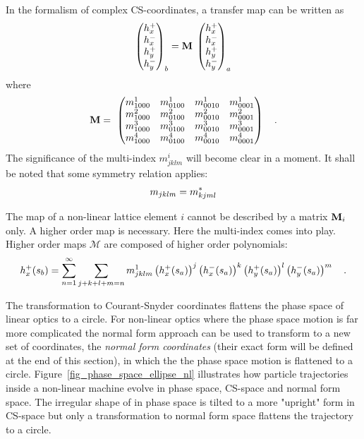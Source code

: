In the formalism of complex CS-coordinates, a transfer map can be written as
%
\begin{equation}
    \begin{pmatrix}
        h_x^+ \\ h_x^- \\ h_y^+ \\ h_y^-
    \end{pmatrix}_b
    =
    \mathbf{M}\;
    \begin{pmatrix}
        h_x^+ \\ h_x^- \\ h_y^+ \\ h_y^-
    \end{pmatrix}_a
\end{equation}
%
where
%
\begin{equation}
 \mathbf{M}  = \
 \begin{pmatrix}
   m_{1000}^1 & m_{0100}^1 & m_{0010}^1 & m_{0001}^1 \\
   m_{1000}^2 & m_{0100}^2 & m_{0010}^2 & m_{0001}^2 \\
   m_{1000}^3 & m_{0100}^3 & m_{0010}^3 & m_{0001}^3 \\
   m_{1000}^4 & m_{0100}^4 & m_{0010}^4 & m_{0001}^4 \\
 \end{pmatrix}
 \quad .
\end{equation}
The significance of the multi-index $m_{jklm}^i$ will become clear in a moment.
It shall be noted that some symmetry relation applies:
%
\begin{equation}
  m_{jklm} = m_{kjml}^*
\end{equation}
%

The map of a non-linear lattice element $i$ cannot be described by a matrix $\mathbf{M}_i$ only.
A higher order map is necessary. Here the multi-index comes into play.
Higher order maps $\mathcal{M}$ are composed of higher order polynomials:
%
\begin{equation}
    h_x^+(s_b) = \sum\limits_{n=1}^\infty\sum\limits_{j+k+l+m=n} m^1_{jklm}
        \left( h_x^+(s_a) \right)^j
        \left( h_x^-(s_a) \right)^k
        \left( h_y^+(s_a) \right)^l
        \left( h_y^-(s_a) \right)^m
    \quad .
\end{equation}
%

The transformation to Courant-Snyder coordinates flattens the phase space of linear optics to a circle.
For non-linear optics where the phase space motion is far more complicated the normal form approach
can be used to transform to a new set of coordinates, the \emph{normal form coordinates}
(their exact form will be defined at the end of this section), in which the
the phase space motion is flattened to a circle.
Figure~\ref{fig_phase_space_ellipse_nl} illustrates how particle trajectories inside a non-linear
machine evolve in phase space, CS-space and normal form space.
The irregular shape of in phase space is tilted to a more "upright" form in CS-space but only a
transformation to normal form space flattens the trajectory to a circle.

